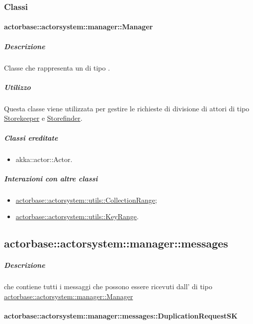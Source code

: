\documentclass{scalatekids-article}
\begin{document}
\subsubsection{Classi}

\paragraph{actorbase::actorsystem::manager::Manager}
\label{sec:actorbase::actorsystem::manager::Manager}

\subparagraph{Descrizione}
Classe che rappresenta un  di tipo .

\subparagraph{Utilizzo}
Questa classe viene utilizzata per gestire le richieste di divisione di attori di tipo
\hyperref[sec:actorbase::actorsystem::storekeeper::Storekeeper]{Storekeeper}
e \hyperref[sec:actorbase::actorsystem::storefinder::Storefinder]{Storefinder}.

\subparagraph{Classi ereditate}
\begin{itemize}
\item akka::actor::Actor.
\end{itemize}

\subparagraph{Interazioni con altre classi}
\begin{itemize}
\item \hyperref[sec:actorbase::actorsystem::utils::CollectionRange]{actorbase::actorsystem::utils::CollectionRange};
\item \hyperref[sec:actorbase::actorsystem::utils::KeyRange]{actorbase::actorsystem::utils::KeyRange}.
\end{itemize}

\subsection{actorbase::actorsystem::manager::messages}
\label{sec:actorbase::actorsystem::manager::messages}

\subparagraph{Descrizione}
 che contiene tutti i messaggi che possono essere ricevuti
dall' di tipo
\hyperref[sec:actorbase::actorsystem::manager::Manager]{actorbase::\allowbreak{}actorsystem::\allowbreak{}manager::\allowbreak{}Manager}

\paragraph{actorbase::actorsystem::manager::messages::DuplicationRequestSK}
\label{sec:actorbase::actorsystem::manager::messages::DuplicationRequestSK}
\end{document}
